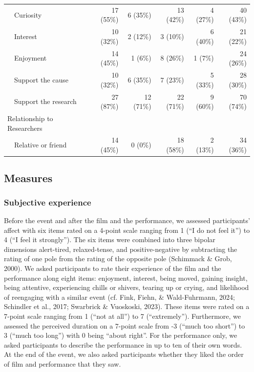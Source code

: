 \documentclass[
  man,floatsintext]{apa6}
\begin{document}
\begin{table}[tbp]
\begin{center}
\begin{threeparttable}
\begin{tabular}{lrrrrr}
\ \  Curiosity & 17 (55\%) & 6 (35\%) & 13 (42\%) & 4 (27\%) & 40 (43\%)\\
\ \  Interest & 10 (32\%) & 2 (12\%) & 3 (10\%) & 6 (40\%) & 21 (22\%)\\
\ \  Enjoyment & 14 (45\%) & 1 (6\%) & 8 (26\%) & 1 (7\%) & 24 (26\%)\\
\ \  Support the cause & 10 (32\%) & 6 (35\%) & 7 (23\%) & 5 (33\%) & 28 (30\%)\\
\ \  Support the research & 27 (87\%) & 12 (71\%) & 22 (71\%) & 9 (60\%) & 70 (74\%)\\
Relationship to Researchers &  &  &  &  & \\
\ \  Relative or friend & 14 (45\%) & 0 (0\%) & 18 (58\%) & 2 (13\%) & 34 (36\%)\\
\bottomrule
\end{tabular}

\end{threeparttable}
\end{center}

\end{table}

\subsection{Measures}\label{measures}

\subsubsection{Subjective experience}\label{subjective-experience}

Before the event and after the film and the performance, we assessed participants' affect with six items rated on a 4-point scale ranging from 1 (``I do not feel it'') to 4 (``I feel it strongly''). The six items were combined into three bipolar dimensions alert-tired, relaxed-tense, and positive-negative by subtracting the rating of one pole from the rating of the opposite pole (Schimmack \& Grob, 2000). We asked participants to rate their experience of the film and the performance along eight items: enjoyment, interest, being moved, gaining insight, being attentive, experiencing chills or shivers, tearing up or crying, and likelihood of reengaging with a similar event (cf. Fink, Fiehn, \& Wald-Fuhrmann, 2024; Schindler et al., 2017; Swarbrick \& Vuoskoski, 2023). These items were rated on a 7-point scale ranging from 1 (``not at all'') to 7 (``extremely''). Furthermore, we assessed the perceived duration on a 7-point scale from -3 (``much too short'') to 3 (``much too long'') with 0 being ``about right''. For the performance only, we asked participants to describe the performance in up to ten of their own words. At the end of the event, we also asked participants whether they liked the order of film and performance that they saw.
\end{document}
